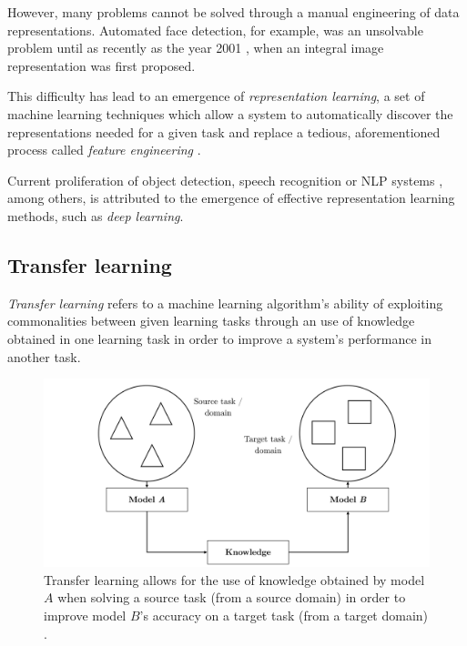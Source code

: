 However, many problems cannot be solved through a manual engineering of data representations. Automated face detection, for example, was an unsolvable problem until as recently as the year 2001 \cite{face2001, introductiontoml}, when an integral image representation was first proposed.

This difficulty has lead to an emergence of \emph{representation learning}, a set of machine learning techniques which allow a system to automatically discover the representations needed for a given task and replace a tedious, aforementioned process called \emph{feature engineering} \cite{wiki:representation_learning}.

Current proliferation of object detection, speech recognition or NLP systems \cite{bengio2012representation}, among others, is attributed to the emergence of effective representation learning methods, such as \emph{deep learning}.

\subsection{Transfer learning}

\emph{Transfer learning} refers to a machine learning algorithm's ability of exploiting commonalities between given learning tasks \cite{bengio2012representation} through an use of knowledge obtained in one learning task in order to improve a system's performance in another task.


\begin{figure}[]
\centering
\includegraphics[scale=0.15]{figures/transfer.png}
\caption{Transfer learning allows for the use of knowledge obtained by model $A$ when solving a source task (from a source domain) in order to improve model $B$'s accuracy on a target task (from a target domain) \cite{state_of_nlp_2019}.}
\end{figure}

